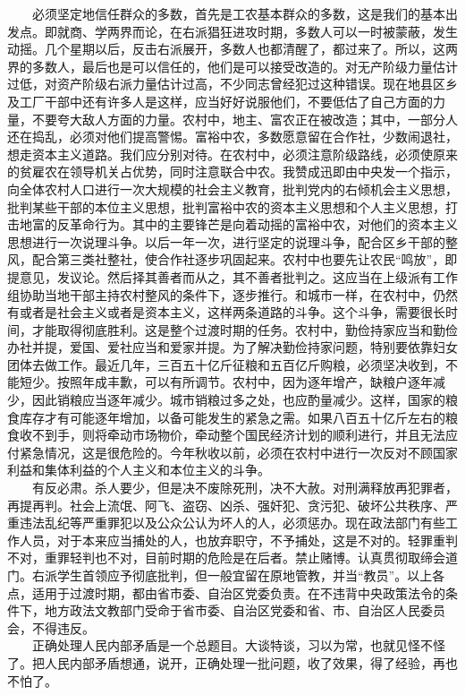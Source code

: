 \documentclass[cn,11pt,chinese]{elegantbook}
\begin{document}
　　必须坚定地信任群众的多数，首先是工农基本群众的多数，这是我们的基本出发点。即就商、学两界而论，在右派猖狂进攻时期，多数人可以一时被蒙蔽，发生动摇。几个星期以后，反击右派展开，多数人也都清醒了，都过来了。所以，这两界的多数人，最后也是可以信任的，他们是可以接受改造的。对无产阶级力量估计过低，对资产阶级右派力量估计过高，不少同志曾经犯过这种错误。现在地县区乡及工厂干部中还有许多人是这样，应当好好说服他们，不要低估了自己方面的力量，不要夸大敌人方面的力量。农村中，地主、富农正在被改造；其中，一部分人还在捣乱，必须对他们提高警惕。富裕中农，多数愿意留在合作社，少数闹退社，想走资本主义道路。我们应分别对待。在农村中，必须注意阶级路线，必须使原来的贫雇农在领导机关占优势，同时注意联合中农。我赞成迅即由中央发一个指示，向全体农村人口进行一次大规模的社会主义教育，批判党内的右倾机会主义思想，批判某些干部的本位主义思想，批判富裕中农的资本主义思想和个人主义思想，打击地富的反革命行为。其中的主要锋芒是向着动摇的富裕中农，对他们的资本主义思想进行一次说理斗争。以后一年一次，进行坚定的说理斗争，配合区乡干部的整风，配合第三类社整社，使合作社逐步巩固起来。农村中也要先让农民“鸣放”，即提意见，发议论。然后择其善者而从之，其不善者批判之。这应当在上级派有工作组协助当地干部主持农村整风的条件下，逐步推行。和城市一样，在农村中，仍然有或者是社会主义或者是资本主义，这样两条道路的斗争。这个斗争，需要很长时间，才能取得彻底胜利。这是整个过渡时期的任务。农村中，勤俭持家应当和勤俭办社并提，爱国、爱社应当和爱家并提。为了解决勤俭持家问题，特别要依靠妇女团体去做工作。最近几年，三百五十亿斤征粮和五百亿斤购粮，必须坚决收到，不能短少。按照年成丰歉，可以有所调节。农村中，因为逐年增产，缺粮户逐年减少，因此销粮应当逐年减少。城市销粮过多之处，也应酌量减少。这样，国家的粮食库存才有可能逐年增加，以备可能发生的紧急之需。如果八百五十亿斤左右的粮食收不到手，则将牵动市场物价，牵动整个国民经济计划的顺利进行，并且无法应付紧急情况，这是很危险的。今年秋收以前，必须在农村中进行一次反对不顾国家利益和集体利益的个人主义和本位主义的斗争。\\
　　有反必肃。杀人要少，但是决不废除死刑，决不大赦。对刑满释放再犯罪者，再提再判。社会上流氓、阿飞、盗窃、凶杀、强奸犯、贪污犯、破坏公共秩序、严重违法乱纪等严重罪犯以及公众公认为坏人的人，必须惩办。现在政法部门有些工作人员，对于本来应当捕处的人，也放弃职守，不予捕处，这是不对的。轻罪重判不对，重罪轻判也不对，目前时期的危险是在后者。禁止赌博。认真贯彻取缔会道门。右派学生首领应予彻底批判，但一般宜留在原地管教，并当“教员”。以上各点，适用于过渡时期，都由省市委、自治区党委负责。在不违背中央政策法令的条件下，地方政法文教部门受命于省市委、自治区党委和省、市、自治区人民委员会，不得违反。\\
　　正确处理人民内部矛盾是一个总题目。大谈特谈，习以为常，也就见怪不怪了。把人民内部矛盾想通，说开，正确处理一批问题，收了效果，得了经验，再也不怕了。\\
\end{document}
